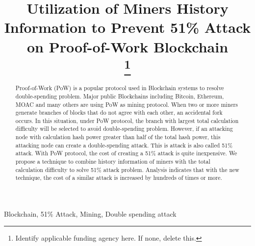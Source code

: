 \documentclass[conference]{IEEEtran}
\begin{document}
\title{Utilization of Miners History Information to Prevent 51\% Attack on Proof-of-Work Blockchain\\
\thanks{Identify applicable funding agency here. If none, delete this.}
}

\author{
\and
{}
\and
{}
}

\maketitle

\begin{abstract}
Proof-of-Work (PoW) is a popular protocol used in Blockchain systems to resolve double-spending problem. Major public Blockchains including Bitcoin, Ethereum, MOAC and many others are using PoW as mining protocol. When two or more miners generate branches of blocks that do not agree with each other, an accidental fork occurs. In this situation, under PoW protocol, the branch with largest total calculation difficulty will be selected to avoid double-spending problem. However, if an attacking node with calculation hash power greater than half of the total hash power, this attacking node can create a double-spending attack. This is attack is also called 51\% attack. With PoW protocol, the cost of creating a 51\% attack is quite inexpensive. We propose a technique to combine history information of miners with the total calculation difficulty to solve 51\% attack problem. Analysis indicates that with the new technique, the cost of a similar attack is increased by hundreds of times or more.
\end{abstract}

\begin{IEEEkeywords}
Blockchain, 51\% Attack, Mining, Double spending attack
\end{IEEEkeywords}
\end{document}
